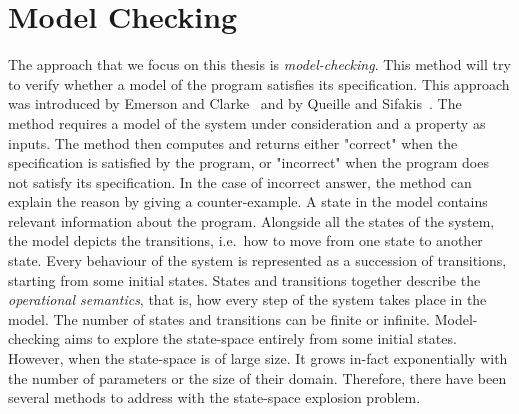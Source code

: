 \chapter{Model Checking}
\label{section:model:checking}
%
%
%
The approach that we focus on this thesis is
\emph{model-checking}.
%
%
This method will try to verify whether a model of the program
satisfies its specification.
%
%
This approach was introduced by Emerson and Clarke~\cite{CE82} and by Queille and Sifakis~\cite{QS82}. The method requires a model of the system under
consideration and a property as inputs. The method then computes and returns either "correct" when the specification is satisfied by the program, or "incorrect" when the program does not satisfy its specification. In the case of incorrect answer, the method can explain the reason by giving a counter-example. A state in the model contains relevant information about the program. Alongside all the states of the system, the model depicts the
transitions, i.e.\ how to move from one state to another state. Every behaviour of the system is represented as a succession of transitions, starting from some initial states. States and transitions together describe the \emph{operational
  semantics}, that is, how every step of the system takes place in the model. The number of states and transitions can be finite or infinite. Model-checking aims to explore the state-space entirely from some initial states. However, when the state-space is of large size. It grows in-fact
exponentially with the number of parameters or the size of their
domain. Therefore, there have been several methods to address with the
state-space explosion problem.
                   
